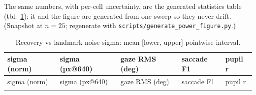 \documentclass[
]{article}
\begin{document}
The same numbers, with per-cell uncertainty, are the generated
statistics table (tbl.~\ref{tbl:noise}); it and the figure are generated
from one sweep so they never drift. (Snapshot at \(n=25\); regenerate
with \texttt{scripts/generate\_power\_figure.py}.)

\begin{longtable}[]{@{}
  >{\raggedright\arraybackslash}p{}
  >{\raggedright\arraybackslash}p{}
  >{\raggedright\arraybackslash}p{}
  >{\raggedright\arraybackslash}p{}
  >{\raggedright\arraybackslash}p{}@{}}
\caption{Recovery vs landmark noise sigma: mean {[}lower, upper{]}
pointwise interval.}\label{tbl:noise}\tabularnewline
\toprule\noalign{}
\begin{minipage}[b]{\linewidth}\raggedright
sigma (norm)
\end{minipage} & \begin{minipage}[b]{\linewidth}\raggedright
sigma (px@640)
\end{minipage} & \begin{minipage}[b]{\linewidth}\raggedright
gaze RMS (deg)
\end{minipage} & \begin{minipage}[b]{\linewidth}\raggedright
saccade F1
\end{minipage} & \begin{minipage}[b]{\linewidth}\raggedright
pupil r
\end{minipage} \\
\midrule\noalign{}
\endfirsthead
\toprule\noalign{}
\begin{minipage}[b]{\linewidth}\raggedright
sigma (norm)
\end{minipage} & \begin{minipage}[b]{\linewidth}\raggedright
sigma (px@640)
\end{minipage} & \begin{minipage}[b]{\linewidth}\raggedright
gaze RMS (deg)
\end{minipage} & \begin{minipage}[b]{\linewidth}\raggedright
saccade F1
\end{minipage} & \begin{minipage}[b]{\linewidth}\raggedright
pupil r
\end{minipage} \\
\midrule\noalign{}
\endhead
\bottomrule\noalign{}

\end{longtable}
\end{document}
